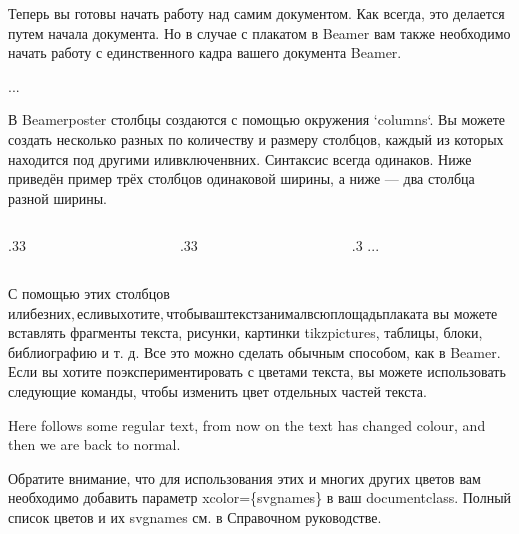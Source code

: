 \documentclass{article}
\begin{document}
Теперь вы готовы начать работу над самим документом. Как всегда, это делается путем начала документа.
Но в случае с плакатом в Beamer вам также необходимо начать работу с единственного кадра вашего документа Beamer.

\begin{frame}
...
\end{frame}


В Beamerposter столбцы создаются с помощью окружения `columns`.
Вы можете создать несколько разных по количеству и размеру столбцов, каждый из которых находится под другими \(или включен в них\).
Синтаксис всегда одинаков.
Ниже приведён пример трёх столбцов одинаковой ширины, а ниже — два столбца разной ширины.

\begin{frame}
\begin{columns}
\begin{column}{.33\textwidth}
\end{column}
\begin{column}{.33\textwidth}
\end{column}
%
\begin{column}{.3\textwidth}
...
\end{column}
\end{columns}
\end{frame}


С помощью этих столбцов \(или без них, если вы хотите, чтобы ваш текст занимал всю площадь плаката\) вы можете вставлять фрагменты текста,
рисунки, картинки tikzpictures, таблицы, блоки, библиографию и т. д. Все это можно сделать обычным способом, как в Beamer.
Если вы хотите поэкспериментировать с цветами текста, вы можете использовать следующие команды, чтобы изменить цвет отдельных частей текста.

Here follows some regular text, \color{BlueViolet} from now on
the text has changed colour, \color{Black} and then we are
back to normal.

Обратите внимание, что для использования этих и многих других цветов вам необходимо добавить параметр xcolor=\{svgnames\} в ваш documentclass.
Полный список цветов и их svgnames см. в Справочном руководстве.
\end{document}

